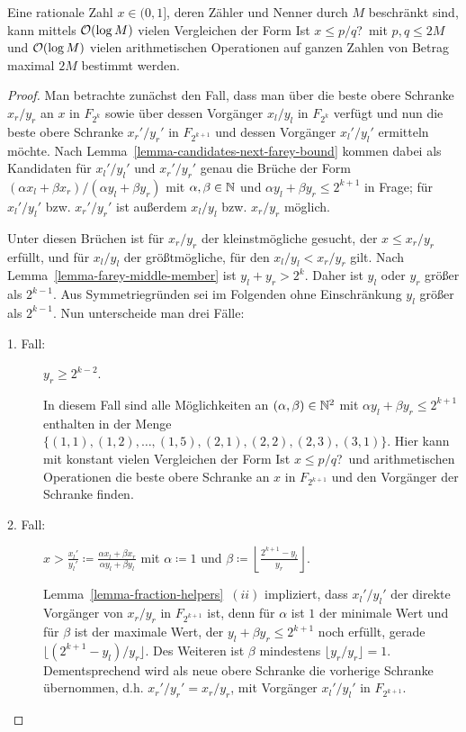 \begin{theorem}\label{theorem-find-fraction}
	Eine rationale Zahl $x\in(0,1]$, deren Zähler und Nenner durch $M$ beschränkt sind, kann mittels $\mathcal{O}(\log M)$ vielen Vergleichen der Form \glqq Ist $x\leq p/q$?\grqq\ mit $p,q\leq 2M$ und $\mathcal{O}(\log M)$ vielen arithmetischen Operationen auf ganzen Zahlen von Betrag maximal $2M$ bestimmt werden.
\end{theorem}
\begin{proof}	
	Man betrachte zunächst den Fall, dass man über die beste obere Schranke $x_r/y_r$ an $x$ in $F_{2^k}$ sowie über dessen Vorgänger $x_l/y_l$ in $F_{2^k}$ verfügt und nun die beste obere Schranke $x_r'/y_r'$ in $F_{2^{k+1}}$ und dessen Vorgänger $x_l'/y_l'$ ermitteln möchte.
	Nach Lemma~\ref{lemma-candidates-next-farey-bound} kommen dabei als Kandidaten für $x_l'/y_l'$ und $x_r'/y_r'$ genau die Brüche der Form $(\alpha x_l + \beta x_r)/(\alpha y_l + \beta y_r)$ mit $\alpha,\beta\in\mathbb{N}$ und $\alpha y_l + \beta y_r \leq 2^{k+1}$ in Frage; für $x_l'/y_l'$ bzw. $x_r'/y_r'$ ist außerdem $x_l/y_l$ bzw. $x_r/y_r$ möglich.
	
	Unter diesen Brüchen ist für $x_r/y_r$ der kleinstmögliche gesucht, der $x\leq x_r/y_r$ erfüllt, und für $x_l/y_l$ der größtmögliche, für den $x_l/y_l < x_r/y_r$ gilt.
	Nach Lemma~\ref{lemma-farey-middle-member} ist $y_l + y_r > 2^k$.
	Daher ist $y_l$ oder $y_r$ größer als $2^{k-1}$.
	Aus Symmetriegründen sei im Folgenden ohne Einschränkung $y_l$ größer als $2^{k-1}$.
	Nun unterscheide man drei Fälle:
	
	\begin{description}
		\item[1. Fall:] $y_r \geq 2^{k-2}$.
		
		In diesem Fall sind alle Möglichkeiten an $(\alpha,\beta)\in\mathbb{N}^2$ mit $\alpha y_l + \beta y_r \leq 2^{k+1}$ enthalten in der Menge $\{ (1,1), (1,2),\dots,(1,5), (2,1), (2,2),(2,3),(3,1) \}$.
		Hier kann mit konstant vielen Vergleichen der Form \glqq Ist $x\leq p/q$?\grqq\ und arithmetischen Operationen die beste obere Schranke an $x$ in $F_{2^{k+1}}$ und den Vorgänger der Schranke finden.
		
		\item[2. Fall:] $x > \frac{x_l'}{y_l'} \coloneq \frac{\alpha x_l + \beta x_r}{\alpha y_l + \beta y_l}$ mit $\alpha \coloneq 1$ und $\beta \coloneq \left\lfloor \frac{2^{k+1} - y_l}{y_r}\right\rfloor$.
		
		Lemma~\ref{lemma-fraction-helpers}~$(ii)$ impliziert, dass $x_l'/y_l'$ der direkte Vorgänger von $x_r/y_r$ in $F_{2^{k+1}}$ ist, denn für $\alpha$ ist $1$ der minimale Wert und für $\beta$ ist der maximale Wert, der $y_l + \beta y_r \leq 2^{k+1}$ noch erfüllt, gerade $\lfloor (2^{k+1} - y_l)/y_r \rfloor$.
		Des Weiteren ist $\beta$ mindestens $\lfloor y_r/y_r \rfloor = 1$.
		Dementsprechend wird als neue obere Schranke die vorherige Schranke übernommen, d.h. $x_r'/y_r' = x_r/y_r$, mit Vorgänger $x_l'/y_l'$ in $F_{2^{k+1}}$.
		

\end{description}
\end{proof}
